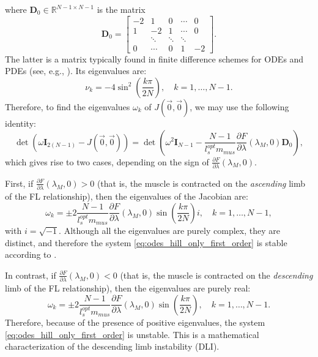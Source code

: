 \documentclass{sfuthesis}
\numberwithin{equation}{section}
\numberwithin{figure}{chapter}
\numberwithin{table}{chapter}
\theoremstyle{definition}
\def\*#1{{\mathbf{#1}}} %
\newcommand{\R}{\mathbb{R}}
\begin{document}
where $\*D_0 \in \R^{N-1 \times N-1}$ is the matrix
\begin{equation}
    \*D_0 = \left[ \begin{array}{ccccc}
        -2 & 1 & 0 & \cdots & 0 \\
        1 & -2 & 1 & \cdots & 0 \\
          & \ddots & \ddots & \ddots\\
        0 &\cdots & 0 & 1 & -2
    \end{array} \right].
\end{equation}
The latter is a matrix typically found in finite difference schemes for ODEs and PDEs (see, e.g., \cite{Strikwerda}). Its eigenvalues are:
\begin{equation}
    \nu_k = -4 \sin^2 \left( \dfrac{k\pi}{2N} \right), \quad k = 1, \dots, N-1.
\end{equation}
Therefore, to find the eigenvalues $\omega_k$ of $J(\vec{0},\vec{0})$, we may use the following identity:
\[
    \det \left(\omega \*I_{2(N-1)} - J(\vec{0}, \vec{0}) \right) = \det \left(\omega^2 \*I_{N-1} - \dfrac{N-1}{l_s^{opt} m_{mus}} \dfrac{\partial F}{\partial \lambda}(\lambda_M, 0) \*D_0 \right),
\]
which gives rise to two cases, depending on the sign of $\frac{\partial F}{\partial \lambda}(\lambda_M, 0)$.

First, if $\frac{\partial F}{\partial \lambda}(\lambda_M, 0) > 0$ (that is, the muscle is contracted on the \textit{ascending} limb of the FL relationship), then the eigenvalues of the Jacobian are:
\begin{equation}
    \omega_k = \pm 2 \dfrac{N-1}{l_s^{opt} m_{mus}} \frac{\partial F}{\partial \lambda}(\lambda_M, 0) \sin \left( \dfrac{k\pi}{2N} \right) i, \quad k = 1, \dots, N-1,
\end{equation}
with $i=\sqrt{-1}$. Although all the eigenvalues are purely complex, they are distinct, and therefore the system \eqref{eq:odes_hill_only_first_order} is stable according to \cite[Theorem 13.1]{HairerNorsettWanner}. 

In contrast, if $\frac{\partial F}{\partial \lambda}(\lambda_M, 0) < 0$ (that is, the muscle is contracted on the \textit{descending} limb of the FL relationship), then the eigenvalues are purely real:
\begin{equation}
    \omega_k = \pm 2 \dfrac{N-1}{l_s^{opt} m_{mus}} \frac{\partial F}{\partial \lambda}(\lambda_M, 0) \sin \left( \dfrac{k\pi}{2N} \right), \quad k = 1, \dots, N-1.
\end{equation}
Therefore, because of the presence of positive eigenvalues, the system \eqref{eq:odes_hill_only_first_order} is unstable. This is a mathematical characterization of the descending limb instability (DLI).
\end{document}
